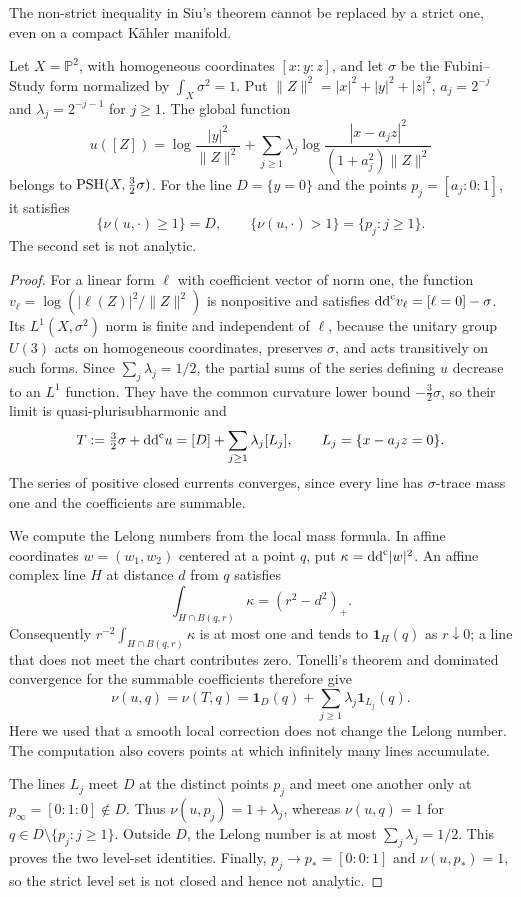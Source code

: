 The non-strict inequality in Siu's theorem cannot be replaced by a strict one, even on a compact K\"ahler manifold.

\begin{example}\label{ex:strict-lelong-level}
Let $X=\mathbb P^2$, with homogeneous coordinates $[x:y:z]$, and let $\sigma$ be the Fubini--Study form normalized by $\int_X\sigma^2=1$. Put $\|Z\|^2=|x|^2+|y|^2+|z|^2$, $a_j=2^{-j}$ and $\lambda_j=2^{-j-1}$ for $j\geq1$. The global function
\[
 u([Z])=\log\frac{|y|^2}{\|Z\|^2}
       +\sum_{j\geq1}\lambda_j
          \log\frac{|x-a_jz|^2}{(1+a_j^2)\|Z\|^2}
\]
belongs to $\mathrm{PSH}(X,\frac32\sigma)$. For the line $D=\{y=0\}$ and the points $p_j=[a_j:0:1]$, it satisfies
\[
 \{\nu(u,\cdot)\geq1\}=D,
 \qquad \{\nu(u,\cdot)>1\}=\{p_j:j\geq1\}.
\]
The second set is not analytic.
\end{example}
\begin{proof}
For a linear form $\ell$ with coefficient vector of norm one, the function $v_\ell=\log(|\ell(Z)|^2/\|Z\|^2)$ is nonpositive and satisfies $\mathrm{dd}^{\mathrm{c}} v_\ell=[\ell=0]-\sigma$. Its $L^1(X,\sigma^2)$ norm is finite and independent of $\ell$, because the unitary group $U(3)$ acts on homogeneous coordinates, preserves $\sigma$, and acts transitively on such forms. Since $\sum_j\lambda_j=1/2$, the partial sums of the series defining $u$ decrease to an $L^1$ function. They have the common curvature lower bound $-\frac32\sigma$, so their limit is quasi-plurisubharmonic and
\[
 T:=\tfrac32\sigma+\mathrm{dd}^{\mathrm{c}} u=[D]+\sum_{j\geq1}\lambda_j[L_j],
 \qquad L_j=\{x-a_jz=0\}.
\]
The series of positive closed currents converges, since every line has $\sigma$-trace mass one and the coefficients are summable.

We compute the Lelong numbers from the local mass formula. In affine coordinates $w=(w_1,w_2)$ centered at a point $q$, put $\kappa=\mathrm{dd}^{\mathrm{c}}|w|^2$. An affine complex line $H$ at distance $d$ from $q$ satisfies
\[
 \int_{H\cap B(q,r)}\kappa=(r^2-d^2)_+.
\]
Consequently $r^{-2}\int_{H\cap B(q,r)}\kappa$ is at most one and tends to $\mathbf1_H(q)$ as $r\downarrow0$; a line that does not meet the chart contributes zero. Tonelli's theorem and dominated convergence for the summable coefficients therefore give
\[
 \nu(u,q)=\nu(T,q)
       =\mathbf1_D(q)+\sum_{j\geq1}\lambda_j\mathbf1_{L_j}(q).
\]
Here we used that a smooth local correction does not change the Lelong number. The computation also covers points at which infinitely many lines accumulate.

The lines $L_j$ meet $D$ at the distinct points $p_j$ and meet one another only at $p_\infty=[0:1:0]\notin D$. Thus $\nu(u,p_j)=1+\lambda_j$, whereas $\nu(u,q)=1$ for $q\in D\setminus\{p_j:j\geq1\}$. Outside $D$, the Lelong number is at most $\sum_j\lambda_j=1/2$. This proves the two level-set identities. Finally, $p_j\to p_*=[0:0:1]$ and $\nu(u,p_*)=1$, so the strict level set is not closed and hence not analytic.
\end{proof}
